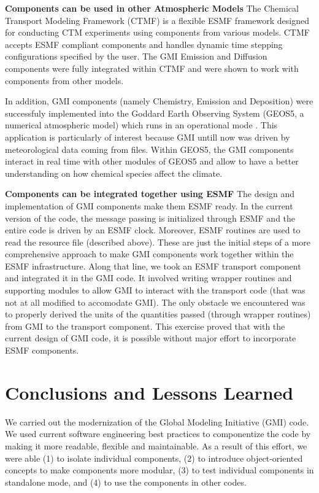 \documentclass[11pt]{article}
\begin{document}
\vskip 0.60cm

\noindent 
{\bf Components can be used in other Atmospheric Models} \newline
The Chemical Transport Modeling Framework (CTMF) is a flexible ESMF framework
designed for conducting CTM experiments using components from various models.
CTMF accepts ESMF compliant components and handles dynamic time stepping 
configurations specified by the user.
The GMI Emission and Diffusion components were fully integrated within 
CTMF and were shown to work with components from other models.

In addition, GMI components (namely Chemistry, Emission and Deposition) 
were successfuly implemented into the Goddard Earth Observing System 
(GEOS5, a numerical atmospheric model) which runs in an operational mode \cite{Rienecker-etal08}.
This application is particularly of interest because GMI untill now
was driven by meteorological data coming from files. 
Within GEOS5, the GMI components interact in real time with other modules
of GEOS5 and allow to have a better understanding on how chemical species
affect the climate.

\vskip 0.60cm

\noindent 
{\bf Components can be integrated together using ESMF} \newline 
The design and implementation of GMI components make them ESMF ready.
In the current version of the code, the message passing is initialized through
ESMF and the entire code is driven by an ESMF clock.
Moreover, ESMF routines are used to read the resource file (described above).
These are just the initial steps of a more comprehensive approach to make
GMI components work together within the ESMF infrastructure.
Along that line, we took an ESMF transport component \cite{Lin04} and integrated it in
the GMI code.
It involved writing wrapper routines and supporting modules to allow
GMI to interact with the transport code (that was not at all modified to 
accomodate GMI). 
The only obstacle we encountered was to properly derived the units of the quantities
passed (through wrapper routines) from GMI to the transport component.
This exercise proved that with the current design of GMI code, it is possible without
major effort to incorporate ESMF components.

%


\section{Conclusions and Lessons Learned} \label{sec:conclusion}
We carried out the modernization of the Global Modeling Initiative (GMI) code.
We used current software engineering best practices to componentize the
code by making it more readable, flexible and maintainable.
As a result of this effort, we were able (1) to isolate individual components,
(2) to introduce object-oriented concepts to make components more modular, 
(3) to test individual components in standalone mode, and (4) to use the
components in other codes.
\end{document}
